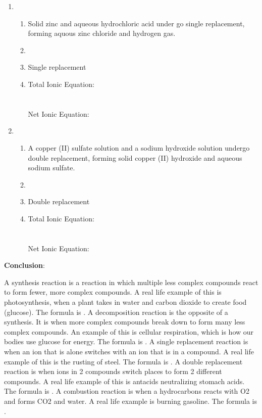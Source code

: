\documentclass[twoside]{article}
\begin{document}
\begin{enumerate}[label=\Roman*.]
    \item %
    \begin{enumerate}[label=\arabic*.]
     \item Solid zinc and aqueous hydrochloric acid under go single replacement, forming aquous zinc chloride and hydrogen gas.
     \item {}
     \item Single replacement
     \item Total Ionic Equation: \\  \\
	   \\
	   Net Ionic Equation: \\ 
    \end{enumerate}
    
    \item %
    \begin{enumerate}[label=\arabic*.]
     \item A copper (II) sulfate solution and a sodium hydroxide solution undergo double replacement, forming solid copper (II) hydroxide and aqueous sodium sulfate.
     \item {}
     \item Double replacement
     \item Total Ionic Equation: \\  \\
	   \\
	   Net Ionic Equation: \\ 
    \end{enumerate}
   
   \end{enumerate}
   
   \noindent \textbf{Conclusion}:
   
   A synthesis reaction is a reaction in which multiple less complex compounds react to form fewer, more complex compounds. A real life example of
	this is photosynthesis, when a plant takes in water and carbon dioxide to create food (glucose). The formula is .
	A decomposition reaction is the opposite of a synthesis. It is when more complex compounds break down to form many less complex compounds. An example
	of this is cellular respiration, which is how our bodies use glucose for energy. The formula is . 
	A single replacement reaction is when an ion that is alone switches with an ion that is in a compound. A real life example of this is the rusting of steel.
	The formula is . A double replacement reaction is when ions in 2 compounds switch places to form 2 different compounds.
	A real life example of this is antacids neutralizing stomach acids. The formula is . A combustion reaction is when a hydrocarbons
	reacts with O2 and forms CO2 and water. A real life example is burning gasoline. The formula is .
\end{document}
